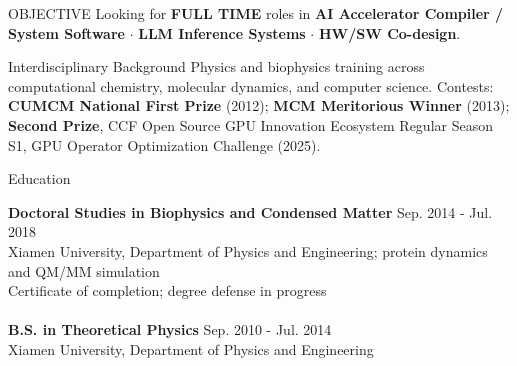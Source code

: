 \documentclass{resume} %
\begin{document}

\begin{rSection}{OBJECTIVE}
{Looking for {\bf FULL TIME} roles in
{\bf AI Accelerator Compiler / System Software} $\cdot$
{\bf LLM Inference Systems} $\cdot$
{\bf HW/SW Co-design}.}
\end{rSection}

\begin{rSection}{Interdisciplinary Background}
{Physics and biophysics training across computational chemistry, molecular dynamics, and computer science. Contests: {\bf CUMCM National First Prize} (2012); {\bf MCM Meritorious Winner} (2013); {\bf Second Prize}, CCF Open Source GPU Innovation Ecosystem Regular Season S1, GPU Operator Optimization Challenge (2025).}
\end{rSection}


\begin{rSection}{Education}

{\bf Doctoral Studies in Biophysics and Condensed Matter} \hfill {Sep. 2014 - Jul. 2018}\\ 
Xiamen University, Department of Physics and Engineering; protein dynamics and QM/MM simulation\\
Certificate of completion; degree defense in progress
\\
\\
{\bf B.S. in Theoretical Physics} \hfill {Sep. 2010 - Jul. 2014}\\
Xiamen University, Department of Physics and Engineering

\end{rSection}


\end{document}
